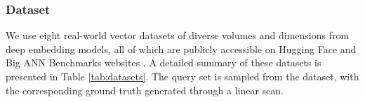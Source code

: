 \begin{table}[t]
 \fontsize{7.5pt}{4mm}\selectfont
  \caption{Statistics of experimental datasets.}
  \vspace{-0.4cm}
  \label{tab:datasets}
  \vspace{-0.3cm}
\end{table}

\subsubsection{\textbf{Dataset}}
We use eight real-world vector datasets of diverse volumes and dimensions from deep embedding models, all of which are publicly accessible on Hugging Face and Big ANN Benchmarks websites \cite{huggingface, bigann}. A detailed summary of these datasets is presented in Table \ref{tab:datasets}. The query set is sampled from the dataset, with the corresponding ground truth generated through a linear scan.

